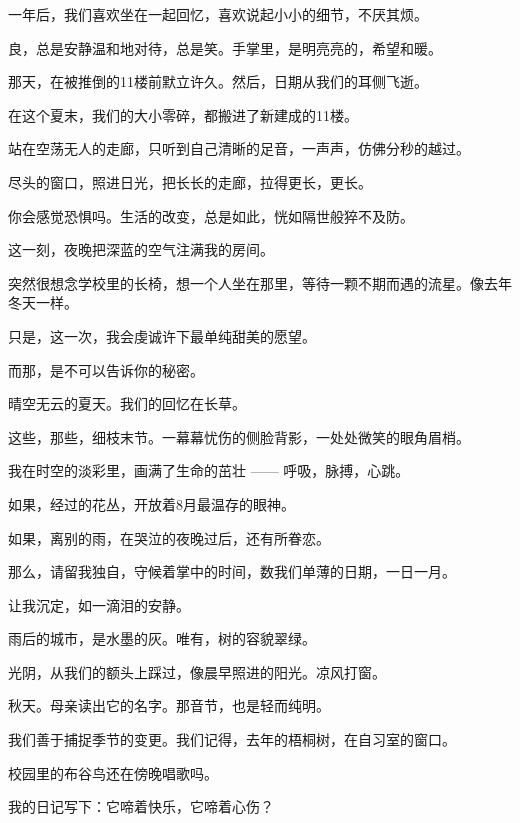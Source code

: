 		一年后，我们喜欢坐在一起回忆，喜欢说起小小的细节，不厌其烦。\par
		良，总是安静温和地对待，总是笑。手掌里，是明亮亮的，希望和暖。

		那天，在被推倒的11楼前默立许久。然后，日期从我们的耳侧飞逝。\par
		在这个夏末，我们的大小零碎，都搬进了新建成的11楼。\par
		站在空荡无人的走廊，只听到自己清晰的足音，一声声，仿佛分秒的越过。\par
		尽头的窗口，照进日光，把长长的走廊，拉得更长，更长。\par
		你会感觉恐惧吗。生活的改变，总是如此，恍如隔世般猝不及防。

		这一刻，夜晚把深蓝的空气注满我的房间。\par
		突然很想念学校里的长椅，想一个人坐在那里，等待一颗不期而遇的流星。像去年冬天一样。\par
		只是，这一次，我会虔诚许下最单纯甜美的愿望。

		而那，是不可以告诉你的秘密。

	\endwriting




		晴空无云的夏天。我们的回忆在长草。\par
		这些，那些，细枝末节。一幕幕忧伤的侧脸背影，一处处微笑的眼角眉梢。\par
		我在时空的淡彩里，画满了生命的茁壮 —— 呼吸，脉搏，心跳。\par
		如果，经过的花丛，开放着8月最温存的眼神。\par
		如果，离别的雨，在哭泣的夜晚过后，还有所眷恋。\par
		那么，请留我独自，守候着掌中的时间，数我们单薄的日期，一日一月。\par
		让我沉定，如一滴泪的安静。


		雨后的城市，是水墨的灰。唯有，树的容貌翠绿。\par
		光阴，从我们的额头上踩过，像晨早照进的阳光。凉风打窗。\par
		秋天。母亲读出它的名字。那音节，也是轻而纯明。\par
		我们善于捕捉季节的变更。我们记得，去年的梧桐树，在自习室的窗口。\par
		校园里的布谷鸟还在傍晚唱歌吗。\par
		我的日记写下：它啼着快乐，它啼着心伤？


